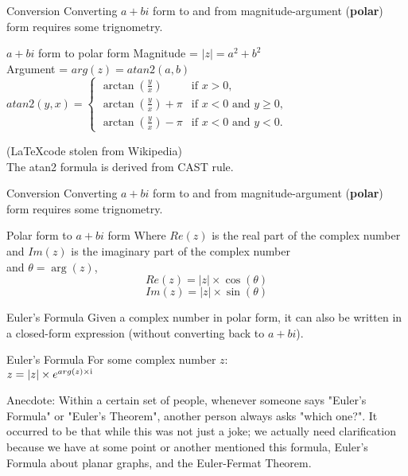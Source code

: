 \begin{namedframe}{Conversion}
	Converting $a + bi$ form to and from magnitude-argument (\textbf{polar}) form requires some trignometry.
	\begin{block}{$a + bi$ form to polar form}
		Magnitude = $|z| = a^2 + b^2$ \\
		Argument = $arg(z) = atan2(a, b)$ \\
		$atan2(y,x)=\begin{cases}\arctan({\frac {y}{x}})&{\text{if }}x>0,\\\arctan({\frac {y}{x}})+\pi &{\text{if }}x<0{\text{ and }}y\geq 0,\\\arctan({\frac {y}{x}})-\pi &{\text{if }}x<0{\text{ and }}y<0.\end{cases}$ \\
		\footnotesize 
	\end{block}
	\footnotesize
	(\LaTeX code stolen from Wikipedia) \\
	\normalsize
	The atan2 formula is derived from CAST rule.
\end{namedframe}

\begin{namedframe}{Conversion}
	Converting $a + bi$ form to and from magnitude-argument (\textbf{polar}) form requires some trignometry.
	\begin{block}{Polar form to $a + bi$ form}
		Where $Re(z)$ is the real part of the complex number and $Im(z)$ is the imaginary part of the complex number \\
		and $\theta = \arg(z)$,
		\[Re(z) = |z| \times \cos(\theta)\]
		\[Im(z) = |z| \times \sin(\theta)\]
	\end{block}
\end{namedframe}

\begin{namedframe}{Euler's Formula}
	Given a complex number in polar form, it can also be written in a closed-form expression (without converting back to $a + bi$).
	\begin{block}{Euler's Formula}
		For some complex number $z$: \\
		$z = |z| \times e^{arg(z) \times \mathrm{i}}$
	\end{block}

	\tiny
	Anecdote: Within a certain set of people, whenever someone says "Euler's Formula" or "Euler's Theorem",
	another person always asks "which one?". It occurred to be that while this was not just a joke; we actually
	need clarification because we have at some point or another mentioned this formula, Euler's Formula about
	planar graphs, and the Euler-Fermat Theorem.
\end{namedframe}

